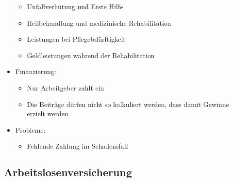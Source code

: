 \documentclass[a4paper, 12pt]{report}
\begin{document}
\begin{itemize}
\begin{itemize}
	    \item Unfallverhütung und Erste Hilfe
	    \item Heilbehandlung und medizinische Rehabilitation
	    \item Leistungen bei Pflegebdürftigkeit
	    \item Geldleistungen während der Rehabilitation
	\end{itemize}
    \item Finanzierung:
	\begin{itemize}
	    \item Nur Arbeitgeber zahlt ein
	    \item Die Beiträge dürfen nicht so kalkuliert werden, dass damit
		Gewinne erzielt werden
	\end{itemize}
    \item Probleme:
	\begin{itemize}
	    \item Fehlende Zahlung im Schadensfall
	\end{itemize}
\end{itemize}

\newpage
\subsection{Arbeitslosenversicherung}
\end{document}
